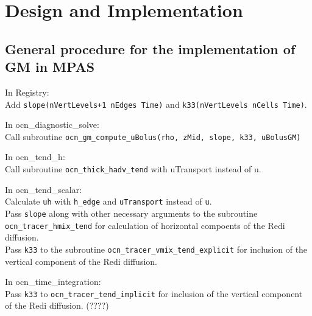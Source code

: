 \documentclass[12pt]{report}
\begin{document}

\chapter{Design and Implementation}\label{cha:design-impl}

\section{General procedure for the implementation of GM in MPAS }\label{sec:code-changes}
\noindent In Registry:\\
Add {\tt slope(nVertLevels+1 nEdges Time)} and {\tt k33(nVertLevels nCells Time)}.

\vspace{5mm}
\noindent In ocn\_diagnostic\_solve:\\
Call subroutine {\tt ocn\_gm\_compute\_uBolus(rho, zMid, slope, k33, uBolusGM)}

\vspace{5mm}
\noindent In ocn\_tend\_h:\\
Call subroutine {\tt ocn\_thick\_hadv\_tend} with uTransport instead of u.

\vspace{5mm}
\noindent In ocn\_tend\_scalar:\\
Calculate {\tt uh} with {\tt h\_edge} and {\tt uTransport} instead of
{\tt u}.\\
Pass {\tt slope} along with other necessary arguments to
the subroutine {\tt ocn\_tracer\_hmix\_tend} for calculation of horizontal
compoents of the Redi diffusion.\\
Pass {\tt k33} to the subroutine {\tt ocn\_tracer\_vmix\_tend\_explicit} for inclusion
of the vertical component of the Redi diffusion.

\vspace{5mm}
\noindent In ocn\_time\_integration:\\
Pass {\tt k33} to {\tt ocn\_tracer\_tend\_implicit} for inclusion of the vertical
component of the Redi diffusion. (????)
\end{document}
